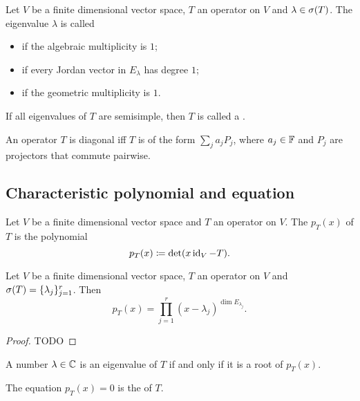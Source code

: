 \begin{definition}
Let $V$ be a finite dimensional vector space, $T$ an operator on $V$ and $\lambda\in\sigma(T)$. The eigenvalue $\lambda$ is called
\begin{itemize}
    \item {} if the algebraic multiplicity is $1$;
    \item {} if every Jordan vector in $E_\lambda$ has degree $1$;
    \item {} if the geometric multiplicity is $1$.
\end{itemize}
If all eigenvalues of $T$ are semisimple, then $T$ is called a .
\end{definition}

\begin{lemma}
An operator $T$ is diagonal iff $T$ is of the form $\sum_j a_jP_j$, where $a_j\in \mathbb{F}$ and $P_j$ are projectors that commute pairwise.
\end{lemma}

\subsection{Characteristic polynomial and equation}
\begin{definition}
Let $V$ be a finite dimensional vector space and $T$ an operator on $V$. The  $p_T(x)$ of $T$ is the polynomial
\[ p_T(x) \coloneqq \det(x\operatorname{id}_V - T). \]
\end{definition}

\begin{proposition}
Let $V$ be a finite dimensional vector space, $T$ an operator on $V$ and $\sigma(T) = \{\lambda_j\}_{j=1}^r$. Then
\[ p_T(x) = \prod_{j=1}^r(x - \lambda_j)^{\dim E_{\lambda_j}}. \]
\end{proposition}
\begin{proof}
TODO
\end{proof}
\begin{corollary}
A number $\lambda\in \mathbb{C}$ is an eigenvalue of $T$ \textup{if and only if} it is a root of $p_T(x)$.
\end{corollary}

\begin{definition}
The equation $p_T(x) = 0$ is the  of $T$.
\end{definition}


